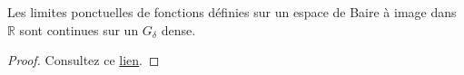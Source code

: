 \begin{thm}
  Les limites ponctuelles de fonctions définies sur un
  espace de Baire à image dans $\mathbb{R}$ sont
  continues sur un $G_\delta$ dense.
\end{thm}

\begin{proof}
  Consultez ce \href{https://proofwiki.org/wiki/Baire-Osgood_Theorem}{lien}.
\end{proof}


